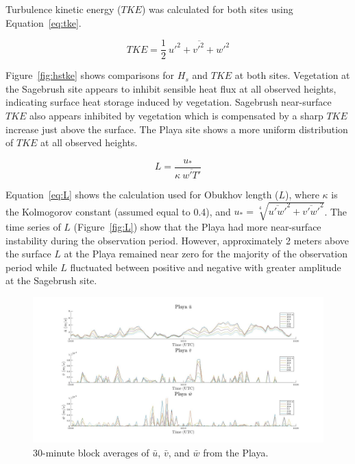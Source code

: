 \documentclass[]{article}
\begin{document}
Turbulence kinetic energy ($TKE$) was calculated for both sites using Equation~\ref{eq:tke}. 

\begin{equation}
TKE = \frac{1}{2}~ \overline{u'^2 + v'^2 + w'^2}
\label{eq:tke}
\end{equation}

Figure~\ref{fig:hstke} shows comparisons for $H_s$ and $TKE$ at both sites. Vegetation at the Sagebrush site appears to inhibit sensible heat flux at all observed heights, indicating surface heat storage induced by vegetation. Sagebrush near-surface $TKE$ also appears inhibited by vegetation which is compensated by a sharp $TKE$ increase just above the surface. The Playa site shows a more uniform distribution of $TKE$ at all observed heights.

\begin{equation}
L = \frac{u_*}{\kappa~ \overline{w'T'}}
\label{eq:L}
\end{equation}

Equation~\ref{eq:L} shows the calculation used for Obukhov length ($L$), where $\kappa$ is the Kolmogorov constant (assumed equal to 0.4), and $u_* = \sqrt[4]{\overline{u'w'}^2 + \overline{v'w'}^2}$. The time series of $L$ (Figure~\ref{fig:L}) show that the Playa had more near-surface instability during the observation period. However, approximately 2 meters above the surface $L$ at the Playa remained near zero for the majority of the observation period while $L$ fluctuated between positive and negative with greater amplitude at the Sagebrush site. 

\begin{figure}
	\centering
	\includegraphics[width=\textwidth]{playarotate}
	\caption{30-minute block averages of $\bar{u}$, $\bar{v}$, and $\bar{w}$ from the Playa.}
	\label{fig:playarotate}
\end{figure}
\end{document}
